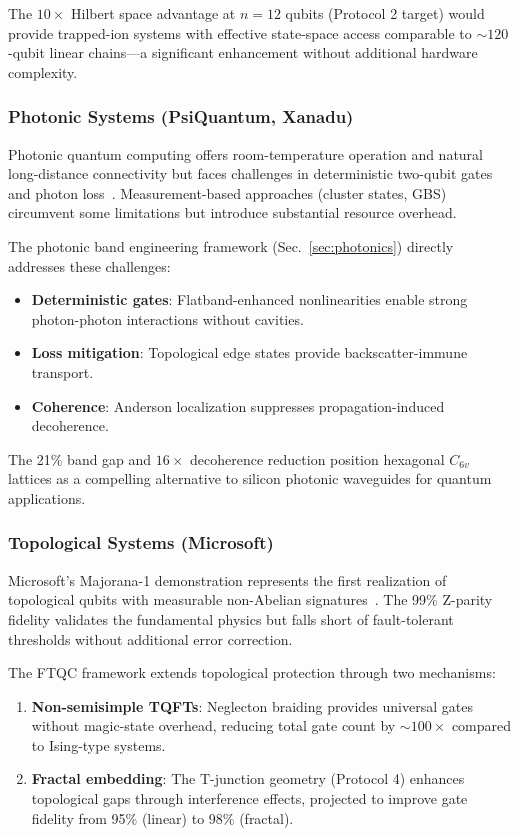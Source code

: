The $10\times$ Hilbert space advantage at $n = 12$ qubits (Protocol 2 target) would provide trapped-ion systems with effective state-space access comparable to $\sim 120$-qubit linear chains—a significant enhancement without additional hardware complexity.

\subsubsection{Photonic Systems (PsiQuantum, Xanadu)}

Photonic quantum computing offers room-temperature operation and natural long-distance connectivity but faces challenges in deterministic two-qubit gates and photon loss~\cite{Wang2020}. Measurement-based approaches (cluster states, GBS) circumvent some limitations but introduce substantial resource overhead.

The photonic band engineering framework (Sec.~\ref{sec:photonics}) directly addresses these challenges:
\begin{itemize}
\item \textbf{Deterministic gates}: Flatband-enhanced nonlinearities enable strong photon-photon interactions without cavities.
\item \textbf{Loss mitigation}: Topological edge states provide backscatter-immune transport.
\item \textbf{Coherence}: Anderson localization suppresses propagation-induced decoherence.
\end{itemize}

The 21\% band gap and $16\times$ decoherence reduction position hexagonal $C_{6v}$ lattices as a compelling alternative to silicon photonic waveguides for quantum applications.

\subsubsection{Topological Systems (Microsoft)}

Microsoft's Majorana-1 demonstration represents the first realization of topological qubits with measurable non-Abelian signatures~\cite{Microsoft2025}. The 99\% Z-parity fidelity validates the fundamental physics but falls short of fault-tolerant thresholds without additional error correction.

The FTQC framework extends topological protection through two mechanisms:
\begin{enumerate}
\item \textbf{Non-semisimple TQFTs}: Neglecton braiding provides universal gates without magic-state overhead, reducing total gate count by $\sim 100\times$ compared to Ising-type systems.
\item \textbf{Fractal embedding}: The T-junction geometry (Protocol 4) enhances topological gaps through interference effects, projected to improve gate fidelity from 95\% (linear) to 98\% (fractal).
\end{enumerate}


